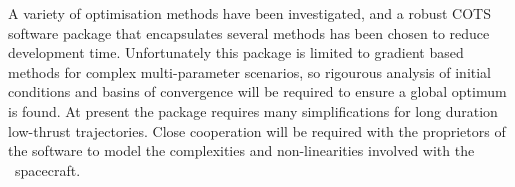 A variety of optimisation methods have been investigated, and a robust COTS software package that encapsulates several methods has been chosen to reduce development time. Unfortunately this package is limited to gradient based methods for complex multi-parameter scenarios, so rigourous analysis of initial conditions and basins of convergence will be required to ensure a global optimum is found. At present the package requires many simplifications for long duration low-thrust trajectories. Close cooperation will be required with the proprietors of the software to model the complexities and non-linearities involved with the \BW\ spacecraft.
 
\clearpage